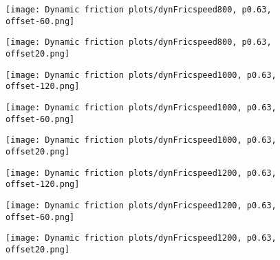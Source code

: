 \documentclass[12pt]{article}
\begin{document}
\begin{figure}[!h]
    \centering
    \begin{minipage}{0.49\textwidth}       
         \texttt{[image: Dynamic friction plots/dynFricspeed800, p0.63, offset-60.png]}
    \end{minipage}
    \begin{minipage}{0.49\textwidth}       
         \texttt{[image: Dynamic friction plots/dynFricspeed800, p0.63, offset20.png]}
    \end{minipage}

\end{figure}

\begin{figure}[!h]
    \centering
    \begin{minipage}{0.49\textwidth}       
         \texttt{[image: Dynamic friction plots/dynFricspeed1000, p0.63, offset-120.png]}
    \end{minipage}
    \begin{minipage}{0.49\textwidth}       
         \texttt{[image: Dynamic friction plots/dynFricspeed1000, p0.63, offset-60.png]}
    \end{minipage}

\end{figure}
\begin{figure}[!h]
    \centering
    \begin{minipage}{0.49\textwidth}       
         \texttt{[image: Dynamic friction plots/dynFricspeed1000, p0.63, offset20.png]}
    \end{minipage}
    \begin{minipage}{0.49\textwidth}       
         \texttt{[image: Dynamic friction plots/dynFricspeed1200, p0.63, offset-120.png]}
    \end{minipage}

\end{figure}
\begin{figure}[!h]
    \centering
    \begin{minipage}{0.49\textwidth}       
         \texttt{[image: Dynamic friction plots/dynFricspeed1200, p0.63, offset-60.png]}
    \end{minipage}
    \begin{minipage}{0.49\textwidth}       
         \texttt{[image: Dynamic friction plots/dynFricspeed1200, p0.63, offset20.png]}
    \end{minipage}

\end{figure}
\end{document}
